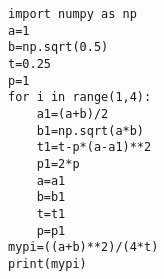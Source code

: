 \documentclass[a4j,12pt,dvipdfmx]{jsarticle}
\begin{document}
\begin{lstlisting}
import numpy as np
a=1
b=np.sqrt(0.5)
t=0.25
p=1
for i in range(1,4):
	a1=(a+b)/2
	b1=np.sqrt(a*b)
	t1=t-p*(a-a1)**2
	p1=2*p
	a=a1
	b=b1
	t=t1
	p=p1
mypi=((a+b)**2)/(4*t)
print(mypi)
\end{lstlisting}
\end{document}
